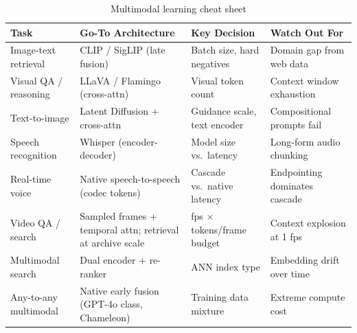 \begin{table}[H]
\centering
\caption{Multimodal learning cheat sheet}
\begin{tabularx}{\textwidth}{lXXl}
\toprule
\textbf{Task} & \textbf{Go-To Architecture} & \textbf{Key Decision} & \textbf{Watch Out For} \\
\midrule
Image-text retrieval & CLIP / SigLIP (late fusion) & Batch size, hard negatives & Domain gap from web data \\
Visual QA / reasoning & LLaVA / Flamingo (cross-attn) & Visual token count & Context window exhaustion \\
Text-to-image & Latent Diffusion + cross-attn & Guidance scale, text encoder & Compositional prompts fail \\
Speech recognition & Whisper (encoder-decoder) & Model size vs.\ latency & Long-form audio chunking \\
Real-time voice & Native speech-to-speech (codec tokens) & Cascade vs.\ native latency & Endpointing dominates cascade \\
Video QA / search & Sampled frames + temporal attn; retrieval at archive scale & fps $\times$ tokens/frame budget & Context explosion at 1 fps \\
Multimodal search & Dual encoder + re-ranker & ANN index type & Embedding drift over time \\
Any-to-any multimodal & Native early fusion (GPT-4o class, Chameleon) & Training data mixture & Extreme compute cost \\
\bottomrule
\end{tabularx}
\end{table}
